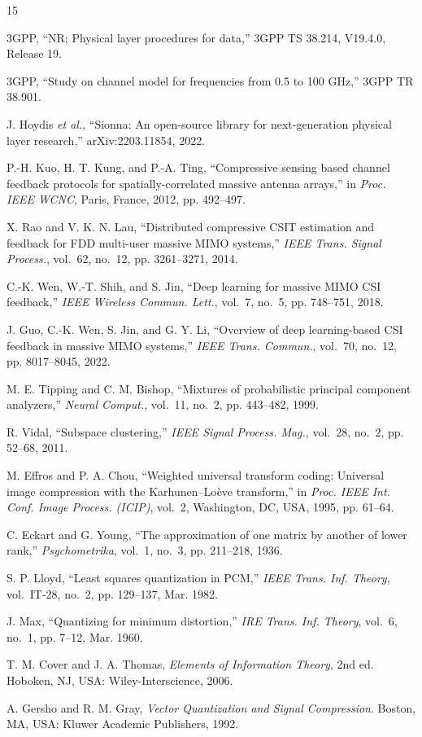 \documentclass[conference]{IEEEtran}
\begin{document}

\begin{thebibliography}{15}

3GPP, ``NR; Physical layer procedures for data,'' 3GPP TS 38.214, V19.4.0, Release 19.

3GPP, ``Study on channel model for frequencies from 0.5 to 100 GHz,'' 3GPP TR 38.901.

J. Hoydis \emph{et al.}, ``Sionna: An open-source library for next-generation physical layer research,'' arXiv:2203.11854, 2022.

P.-H. Kuo, H. T. Kung, and P.-A. Ting, ``Compressive sensing based channel feedback protocols for spatially-correlated massive antenna arrays,'' in \emph{Proc. IEEE WCNC}, Paris, France, 2012, pp. 492--497.

X. Rao and V. K. N. Lau, ``Distributed compressive CSIT estimation and feedback for FDD multi-user massive MIMO systems,'' \emph{IEEE Trans. Signal Process.}, vol.~62, no.~12, pp. 3261--3271, 2014.

C.-K. Wen, W.-T. Shih, and S. Jin, ``Deep learning for massive MIMO CSI feedback,'' \emph{IEEE Wireless Commun. Lett.}, vol.~7, no.~5, pp. 748--751, 2018.

J. Guo, C.-K. Wen, S. Jin, and G. Y. Li, ``Overview of deep learning-based CSI feedback in massive MIMO systems,'' \emph{IEEE Trans. Commun.}, vol.~70, no.~12, pp. 8017--8045, 2022.

M. E. Tipping and C. M. Bishop, ``Mixtures of probabilistic principal component analyzers,'' \emph{Neural Comput.}, vol.~11, no.~2, pp. 443--482, 1999.

R. Vidal, ``Subspace clustering,'' \emph{IEEE Signal Process. Mag.}, vol.~28, no.~2, pp. 52--68, 2011.

M. Effros and P. A. Chou, ``Weighted universal transform coding: Universal image compression with the Karhunen--Lo\`{e}ve transform,'' in \emph{Proc. IEEE Int. Conf. Image Process. (ICIP)}, vol.~2, Washington, DC, USA, 1995, pp. 61--64.

C. Eckart and G. Young, ``The approximation of one matrix by another of lower rank,'' \emph{Psychometrika}, vol.~1, no.~3, pp. 211--218, 1936.

S. P. Lloyd, ``Least squares quantization in PCM,'' \emph{IEEE Trans. Inf. Theory}, vol.~IT-28, no.~2, pp. 129--137, Mar. 1982.

J. Max, ``Quantizing for minimum distortion,'' \emph{IRE Trans. Inf. Theory}, vol.~6, no.~1, pp. 7--12, Mar. 1960.

T. M. Cover and J. A. Thomas, \emph{Elements of Information Theory}, 2nd ed. Hoboken, NJ, USA: Wiley-Interscience, 2006.

A. Gersho and R. M. Gray, \emph{Vector Quantization and Signal Compression}. Boston, MA, USA: Kluwer Academic Publishers, 1992.

\end{thebibliography}
\end{document}

